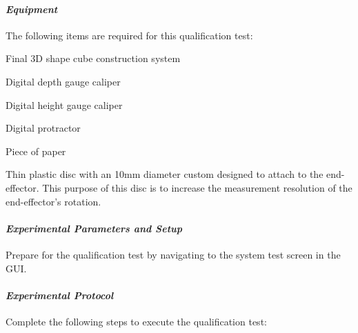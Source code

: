 \paragraph{\textit{Equipment}}

The following items are required for this qualification test:

\begin{compactitem}
	\item Final 3D shape cube construction system
	\item Digital depth gauge caliper
	\item Digital height gauge caliper
	\item Digital protractor
	\item Piece of paper
	\item Thin plastic disc with an 10mm diameter custom designed to attach to the end-effector. This purpose of this disc is to increase the measurement resolution of the end-effector's rotation.
\end{compactitem}

\paragraph{\textit{Experimental Parameters and Setup}}

Prepare for the qualification test by navigating to the system test screen in the GUI.

\paragraph{\textit{Experimental Protocol}}

Complete the following steps to execute the qualification test:

